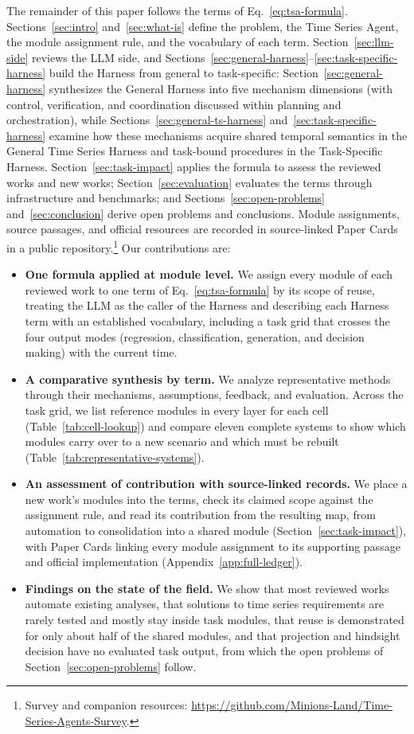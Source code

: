 \documentclass[preprints,article,submit,moreauthors]{Definitions/mdpi}
\begin{document}
The remainder of this paper follows the terms of Eq.~\eqref{eq:tsa-formula}. Sections~\ref{sec:intro} and~\ref{sec:what-is} define the problem, the Time Series Agent, the module assignment rule, and the vocabulary of each term. Section~\ref{sec:llm-side} reviews the LLM side, and Sections~\ref{sec:general-harness}--\ref{sec:task-specific-harness} build the Harness from general to task-specific: Section~\ref{sec:general-harness} synthesizes the General Harness into five mechanism dimensions (with control, verification, and coordination discussed within planning and orchestration), while Sections~\ref{sec:general-ts-harness} and~\ref{sec:task-specific-harness} examine how these mechanisms acquire shared temporal semantics in the General Time Series Harness and task-bound procedures in the Task-Specific Harness. Section~\ref{sec:task-impact} applies the formula to assess the reviewed works and new works; Section~\ref{sec:evaluation} evaluates the terms through infrastructure and benchmarks; and Sections~\ref{sec:open-problems} and~\ref{sec:conclusion} derive open problems and conclusions. Module assignments, source passages, and official resources are recorded in source-linked Paper Cards in a public repository.\footnote{Survey and companion resources: \url{https://github.com/Minions-Land/Time-Series-Agents-Survey}.} Our contributions are:
\begin{itemize}
  \item \textbf{One formula applied at module level.} We assign every module of each reviewed work to one term of Eq.~\eqref{eq:tsa-formula} by its scope of reuse, treating the LLM as the caller of the Harness and describing each Harness term with an established vocabulary, including a task grid that crosses the four output modes (regression, classification, generation, and decision making) with the current time.
  \item \textbf{A comparative synthesis by term.} We analyze representative methods through their mechanisms, assumptions, feedback, and evaluation. Across the task grid, we list reference modules in every layer for each cell (Table~\ref{tab:cell-lookup}) and compare eleven complete systems to show which modules carry over to a new scenario and which must be rebuilt (Table~\ref{tab:representative-systems}).
  \item \textbf{An assessment of contribution with source-linked records.} We place a new work's modules into the terms, check its claimed scope against the assignment rule, and read its contribution from the resulting map, from automation to consolidation into a shared module (Section~\ref{sec:task-impact}), with Paper Cards linking every module assignment to its supporting passage and official implementation (Appendix~\ref{app:full-ledger}).
  \item \textbf{Findings on the state of the field.} We show that most reviewed works automate existing analyses, that solutions to time series requirements are rarely tested and mostly stay inside task modules, that reuse is demonstrated for only about half of the shared modules, and that projection and hindsight decision have no evaluated task output, from which the open problems of Section~\ref{sec:open-problems} follow.
\end{itemize}
\end{document}
